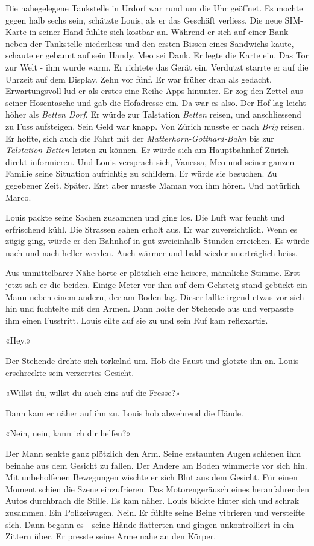 Die nahegelegene Tankstelle in Urdorf war rund um die Uhr geöffnet. Es
mochte gegen halb sechs sein, schätzte Louis, als er das Geschäft
verliess. Die neue SIM-Karte in seiner Hand fühlte sich kostbar an.
Während er sich auf einer Bank neben der Tankstelle niederliess und den
ersten Bissen eines Sandwichs kaute, schaute er gebannt auf sein Handy.
Meo sei Dank. Er legte die Karte ein. Das Tor zur Welt - ihm wurde warm. Er richtete das
Gerät ein. Verdutzt starrte er auf die Uhrzeit auf dem Display. Zehn 
vor fünf. Er war früher dran als gedacht. Erwartungsvoll lud er als
erstes eine Reihe Apps hinunter. Er zog den Zettel aus
seiner Hosentasche und gab die Hofadresse ein.
Da war es also. Der Hof lag leicht höher als \emph{Betten Dorf}. Er
würde zur Talstation \emph{Betten} reisen, und anschliessend zu Fuss aufsteigen. Sein Geld war knapp. Von Zürich musste er
nach \emph{Brig} reisen. Er hoffte, sich auch die Fahrt mit der
\emph{Matterhorn-Gotthard-Bahn} bis zur \emph{Talstation Betten} leisten zu können. 
Er würde sich am Hauptbahnhof Zürich direkt informieren. Und Louis
versprach sich, Vanessa, Meo und seiner ganzen Familie seine Situation
aufrichtig zu schildern. Er würde sie besuchen. Zu gegebener Zeit. Später.
Erst aber musste Maman von ihm hören. Und natürlich Marco.

Louis packte seine Sachen zusammen und ging los. Die Luft war feucht und
erfrischend kühl. Die Strassen sahen erholt aus. Er war zuversichtlich.
Wenn es zügig ging, würde er den Bahnhof in gut zweieinhalb Stunden
erreichen. Es würde nach und nach heller werden. Auch wärmer und bald wieder unerträglich heiss. 

Aus unmittelbarer Nähe hörte er plötzlich eine heisere, männliche
Stimme. Erst jetzt sah er die beiden. Einige Meter vor ihm auf dem
Gehsteig stand gebückt ein Mann neben einem andern, der am Boden lag.
Dieser lallte irgend etwas vor sich hin und fuchtelte mit den Armen.
Dann holte der Stehende aus und verpasste ihm einen Fusstritt.
Louis eilte auf sie zu und sein Ruf kam reflexartig.

«Hey.»

Der Stehende drehte sich torkelnd um. Hob die Faust und glotzte ihn an.
Louis erschreckte sein verzerrtes Gesicht.

«Willst du, willst du auch eins auf die Fresse?»

Dann kam er näher auf ihn zu. Louis hob abwehrend die Hände.

«Nein, nein, kann ich dir helfen?»

Der Mann senkte ganz plötzlich den Arm. Seine erstaunten Augen schienen
ihm beinahe aus dem Gesicht zu fallen. Der Andere am Boden wimmerte vor
sich hin. Mit unbeholfenen Bewegungen wischte er sich Blut aus dem
Gesicht. Für einen Moment schien die Szene einzufrieren.
Das Motorengeräusch eines heranfahrenden Autos durchbrach
die Stille. Es kam näher. Louis blickte hinter sich und schrak
zusammen. Ein Polizeiwagen. Nein. Er fühlte seine Beine vibrieren und
versteifte sich. Dann begann es - seine Hände flatterten und gingen
unkontrolliert in ein Zittern über. Er presste seine Arme nahe an den
Körper.

